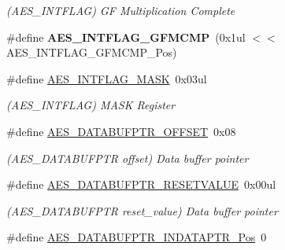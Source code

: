 \begin{DoxyCompactItemize}
\begin{DoxyCompactList}\small\item\em (A\+E\+S\+\_\+\+I\+N\+T\+F\+L\+A\+G) G\+F Multiplication Complete \end{DoxyCompactList}\item 
\hypertarget{group___s_a_m_l21___a_e_s_gaf086ef0f7df725e86ceecd07c83c69ad}{}\#define {\bfseries A\+E\+S\+\_\+\+I\+N\+T\+F\+L\+A\+G\+\_\+\+G\+F\+M\+C\+M\+P}~(0x1ul $<$$<$ A\+E\+S\+\_\+\+I\+N\+T\+F\+L\+A\+G\+\_\+\+G\+F\+M\+C\+M\+P\+\_\+\+Pos)\label{group___s_a_m_l21___a_e_s_gaf086ef0f7df725e86ceecd07c83c69ad}

\item 
\hypertarget{group___s_a_m_l21___a_e_s_gadc21177c51fa0ebba980cb432571f2a3}{}\#define \hyperlink{group___s_a_m_l21___a_e_s_gadc21177c51fa0ebba980cb432571f2a3}{A\+E\+S\+\_\+\+I\+N\+T\+F\+L\+A\+G\+\_\+\+M\+A\+S\+K}~0x03ul\label{group___s_a_m_l21___a_e_s_gadc21177c51fa0ebba980cb432571f2a3}

\begin{DoxyCompactList}\small\item\em (A\+E\+S\+\_\+\+I\+N\+T\+F\+L\+A\+G) M\+A\+S\+K Register \end{DoxyCompactList}\item 
\hypertarget{group___s_a_m_l21___a_e_s_ga12823b5739ecdb1fdd676b6d5a8e701c}{}\#define \hyperlink{group___s_a_m_l21___a_e_s_ga12823b5739ecdb1fdd676b6d5a8e701c}{A\+E\+S\+\_\+\+D\+A\+T\+A\+B\+U\+F\+P\+T\+R\+\_\+\+O\+F\+F\+S\+E\+T}~0x08\label{group___s_a_m_l21___a_e_s_ga12823b5739ecdb1fdd676b6d5a8e701c}

\begin{DoxyCompactList}\small\item\em (A\+E\+S\+\_\+\+D\+A\+T\+A\+B\+U\+F\+P\+T\+R offset) Data buffer pointer \end{DoxyCompactList}\item 
\hypertarget{group___s_a_m_l21___a_e_s_ga1318e685042491228cf65adbc20e847d}{}\#define \hyperlink{group___s_a_m_l21___a_e_s_ga1318e685042491228cf65adbc20e847d}{A\+E\+S\+\_\+\+D\+A\+T\+A\+B\+U\+F\+P\+T\+R\+\_\+\+R\+E\+S\+E\+T\+V\+A\+L\+U\+E}~0x00ul\label{group___s_a_m_l21___a_e_s_ga1318e685042491228cf65adbc20e847d}

\begin{DoxyCompactList}\small\item\em (A\+E\+S\+\_\+\+D\+A\+T\+A\+B\+U\+F\+P\+T\+R reset\+\_\+value) Data buffer pointer \end{DoxyCompactList}\item 
\hypertarget{group___s_a_m_l21___a_e_s_ga915d567de3a6921a7af37e419cbfb473}{}\#define \hyperlink{group___s_a_m_l21___a_e_s_ga915d567de3a6921a7af37e419cbfb473}{A\+E\+S\+\_\+\+D\+A\+T\+A\+B\+U\+F\+P\+T\+R\+\_\+\+I\+N\+D\+A\+T\+A\+P\+T\+R\+\_\+\+Pos}~0\label{group___s_a_m_l21___a_e_s_ga915d567de3a6921a7af37e419cbfb473}


\end{DoxyCompactItemize}
